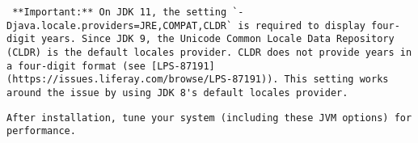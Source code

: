 \noindent\hrulefill

\noindent\hrulefill

\begin{verbatim}
 **Important:** On JDK 11, the setting `-Djava.locale.providers=JRE,COMPAT,CLDR` is required to display four-digit years. Since JDK 9, the Unicode Common Locale Data Repository (CLDR) is the default locales provider. CLDR does not provide years in a four-digit format (see [LPS-87191](https://issues.liferay.com/browse/LPS-87191)). This setting works around the issue by using JDK 8's default locales provider.
\end{verbatim}

\noindent\hrulefill

\begin{verbatim}
After installation, tune your system (including these JVM options) for
performance. 
\end{verbatim}

